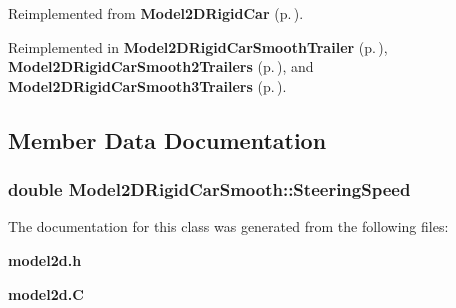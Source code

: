 Reimplemented from {\bf Model2DRigid\-Car} {\rm (p.\,\pageref{classModel2DRigidCar_a2})}.

Reimplemented in {\bf Model2DRigid\-Car\-Smooth\-Trailer} {\rm (p.\,\pageref{classModel2DRigidCarSmoothTrailer_a2})}, {\bf Model2DRigid\-Car\-Smooth2Trailers} {\rm (p.\,\pageref{classModel2DRigidCarSmooth2Trailers_a2})}, and {\bf Model2DRigid\-Car\-Smooth3Trailers} {\rm (p.\,\pageref{classModel2DRigidCarSmooth3Trailers_a2})}.

\subsection{Member Data Documentation}
\subsubsection{\setlength{\rightskip}{0pt plus 5cm}double Model2DRigid\-Car\-Smooth::Steering\-Speed}\label{classModel2DRigidCarSmooth_m0}




The documentation for this class was generated from the following files:\begin{CompactItemize}
\item 
{\bf model2d.h}\item 
{\bf model2d.C}\end{CompactItemize}
